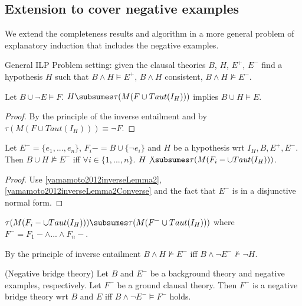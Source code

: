 \subsection{Extension to cover negative examples}
We extend the completeness results and algorithm in a more general problem of explanatory induction that includes the negative examples.
\begin{defn}General ILP Problem setting: given the clausal theories $B$, $H$, $E^+$, $E^-$ find a hypothesis $H$ such that $B \wedge H \models E^{+}$, $B \wedge H$ consistent, $B \wedge H \not\models E^{-}$.
\end{defn}

\begin{lemma}\label{yamamoto2012inverseLemma2Converse}
Let $B \cup \neg E \models F$. $H \subsumes \tau(M(F \cup Taut(I_H)))$ implies
$B \cup H \models E$.
\end{lemma}
\begin{proof}
By the principle of the inverse entailment and by $\tau(M(F \cup Taut(I_H))) \equiv \neg F$.
\end{proof}

\begin{lemma}
Let $E^{-}=\{e_1,...,e_n\}$, $F_i-=B \cup \{\neg e_i\}$ and $H$ be
a hypothesis wrt $I_H, B, E^{+}, E^{-}$.
Then $B \cup H \not\models E^{-}$ iff
$\forall i \in \{1,...,n\}.$ $H \not\subsumes \tau(M(F_i- \cup Taut(I_H)))$.
\end{lemma}

\begin{proof}
Use \ref{yamamoto2012inverseLemma2}, \ref{yamamoto2012inverseLemma2Converse} and the fact that $E^{-}$ is in a disjunctive normal form.
\end{proof}

\begin{conjecture}
$\tau(M(F_i- \cup Taut(I_H))) \subsumes \tau(M(F^{-} \cup Taut(I_H)))$
where $F^{-}=F_1- \wedge ... \wedge F_n-$.
\end{conjecture}

By the principle of inverse entailment
$B \wedge H \not\models E^{-}$ iff
$B \wedge \neg E^{-} \not\models \neg H$.

\begin{defn}
(Negative bridge theory) Let $B$ and $E^{-}$ be a background theory and negative examples, respectively. Let $F^{-}$ be a ground clausal theory. Then $F^{-}$ is a negative bridge theory wrt $B$ and $E$ iff $B \wedge \neg E^{-} \models F^{-}$ holds.
\end{defn}

